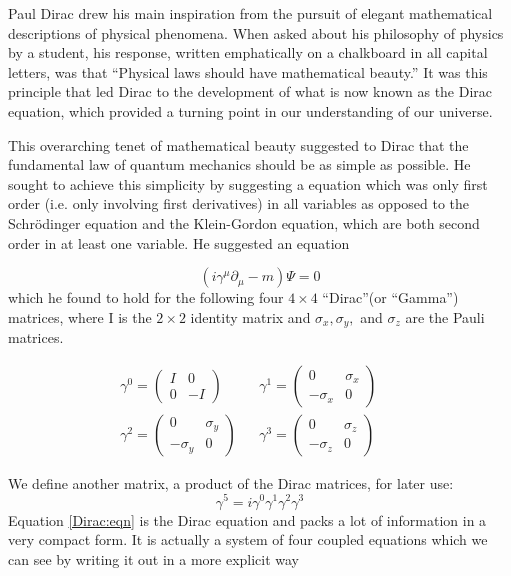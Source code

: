 \documentclass[12pt]{book}
\begin{document}
Paul Dirac drew his main inspiration from the pursuit of elegant mathematical descriptions of physical phenomena. When asked about his philosophy of physics by a student, his response, written emphatically on a chalkboard in all capital letters, was that ``Physical laws should have mathematical beauty.'' It was this principle that led Dirac to the development of what is now known as the Dirac equation, which provided a turning point in our understanding of our universe\cite{gottfried}. 

This overarching tenet of mathematical beauty suggested to Dirac that the fundamental law of quantum mechanics should be as simple as possible. He sought to achieve this simplicity by suggesting a equation which was only first order (i.e. only involving first derivatives) in all variables as opposed to the Schr\"{o}dinger equation and the Klein-Gordon equation, which are both second order in at least one variable. He suggested an equation 

\begin{equation}\label{Dirac:eqn}
\boxed{
(i\gamma^{\mu}\partial_{\mu}-m)\Psi=0
}
\end{equation}
which he found to hold for the following four $4\times 4$ ``Dirac''(or ``Gamma'') matrices, where I is the $2\times 2$ identity matrix and $\sigma_{x},\sigma_{y},$ and $\sigma_{z}$ are the Pauli matrices.

\begin{align}
\gamma^{0}=\left( \begin{array}{cc}
I & 0 \\
0 & -I \end{array} \right) &&
\gamma^{1}=\left( \begin{array}{cc}
0 & \sigma_{x} \\
-\sigma_{x} & 0 \end{array} \right) && \\
\gamma^{2}=\left( \begin{array}{cc}
0 & \sigma_{y} \\
-\sigma_{y} & 0 \end{array} \right) &&
\gamma^{3}=\left( \begin{array}{cc}
0 & \sigma_{z} \\
-\sigma_{z} & 0 \end{array} \right)
\end{align}

We define another matrix, a product of the Dirac matrices, for later use:
\begin{equation}
\gamma^{5}=i\gamma^{0}\gamma^{1}\gamma^{2}\gamma^{3}
\end{equation}
Equation \ref{Dirac:eqn} is the Dirac equation and packs a lot of information in a very compact form. It is actually a system of four coupled equations which we can see by writing it out in a more explicit way
\end{document}
